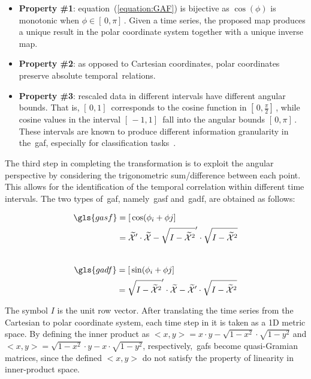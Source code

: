 \begin{itemize}[leftmargin=*,labelsep=5.8mm]
\item \textbf{{Property \#1}}: equation~(\ref{equation:GAF}) is bijective as $\cos(\phi)$ is monotonic when $\phi \in [\,0,\pi]\,$. Given a time series, the proposed map produces a unique result in the polar coordinate system together with a unique inverse map. 
\item \textbf{{Property \#2}}: as opposed to Cartesian coordinates, polar coordinates preserve absolute temporal~relations.
\item \textbf{{Property \#3}}: rescaled data in different intervals have different angular bounds. That is, $[\,0,1]\,$ corresponds to the cosine function in $[\,0,\frac{\pi}{2}]\,$, while cosine values in the interval $[\,-1,1]\,$ fall into the angular bounds $[\,0,\pi]\,$. These intervals are known to produce different information granularity in the~\gls{gaf}, especially for classification tasks~\citep{wang_imaging_2015}.
\end{itemize}

The third step in completing the transformation is to exploit the angular perspective by considering the trigonometric sum/difference between each point. This allows for the identification of the temporal correlation within different time intervals. The two types of~\gls{gaf}, namely~\gls{gasf} and~\gls{gadf}, are obtained as follows:

\begin{equation}
\begin{aligned}
\gls{gasf} &= [\,\cos(\phi_{i} + \phi{j}]\, \\
	 &= \widetilde{\mathcal{X}}' \cdot \widetilde{\mathcal{X}} - \sqrt{I-\widetilde{\mathcal{X}}^2}' \cdot \sqrt{I-\widetilde{\mathcal{X}}^2}
\end{aligned}
\end{equation}
\\
\begin{equation}
\begin{aligned}
\gls{gadf} &= [\,\sin(\phi_{i} + \phi{j}]\, \\
	 &= \sqrt{I-\widetilde{\mathcal{X}}^2}' \cdot \widetilde{\mathcal{X}} - \widetilde{\mathcal{X}}' \cdot \sqrt{I-\widetilde{\mathcal{X}}^2}\\
\end{aligned}
\end{equation}

The symbol $I$ is the unit row vector. After translating the time series from the Cartesian to polar coordinate system, each time step in it is taken as a 1D metric space. By defining the inner product as $<x,y> = x \cdot y - \sqrt{1-x^2} \cdot \sqrt{1-y^2}$ and $<x,y> = \sqrt{1-x^2} \cdot y - x \cdot \sqrt{1-y^2}$,
respectively,~\gls{gaf}s become {quasi-Gramian} matrices, since the defined $<x,y>$ do not satisfy the property of linearity in inner-product space.

